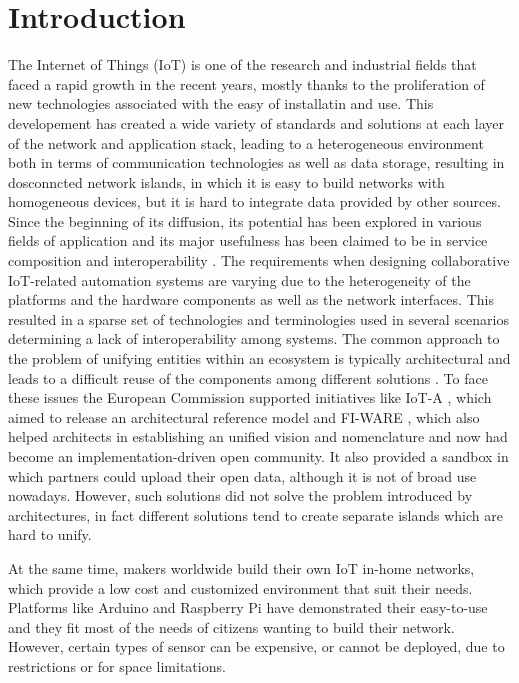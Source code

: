 \section{Introduction}
The Internet of Things (IoT) is one of the research and industrial fields that faced a rapid growth in the recent years, mostly thanks to the proliferation of new technologies associated with the easy of installatin and use. This developement has created a wide variety of standards and solutions at each layer of the network and application stack, leading to a heterogeneous environment both in terms of communication technologies as well as data storage, resulting in dosconncted network islands, in which it is easy to build networks with homogeneous devices, but it is hard to integrate data provided by other sources. Since the beginning of its diffusion, its potential has been explored in various fields of application and its major usefulness has been claimed to be in service composition and interoperability \cite{atzori2010internet}. The requirements when designing collaborative IoT-related automation systems are varying due to the heterogeneity of the platforms and the hardware components as well as the network interfaces.
This resulted in a sparse set of technologies and terminologies used in several scenarios determining a lack of interoperability among systems.
The common approach to the problem of unifying entities within an ecosystem is typically architectural and leads to a difficult reuse of the components among different solutions \cite{krco2014designing}.
To face these issues the European Commission supported initiatives like IoT-A \cite{iot-a}, which aimed to release an architectural reference model and FI-WARE \cite{fiware}, which also helped architects in establishing an unified vision and nomenclature and now had become an implementation-driven open community.
It also provided a sandbox in which partners could upload their open data, although it is not of broad use nowadays.
However, such solutions did not solve the problem introduced by architectures, in fact different solutions tend to create separate islands which are hard to unify.

At the same time, makers worldwide build their own IoT in-home networks, which provide a low cost and customized environment that suit their needs. Platforms like Arduino and Raspberry Pi have demonstrated their easy-to-use and they fit most of the needs of citizens wanting to build their network. However, certain types of sensor can be expensive, or cannot be deployed, due to restrictions or for space limitations. 


